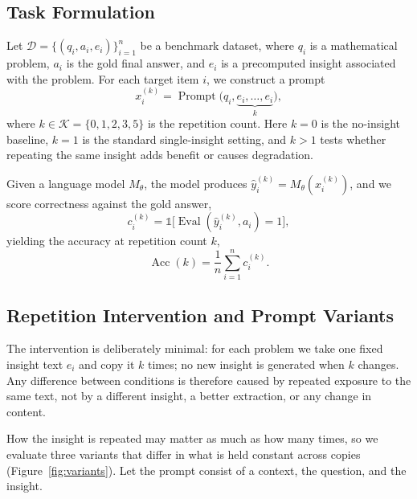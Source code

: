 
\subsection{Task Formulation}
\label{sec:task-formulation}

Let $\mathcal{D} = \{(q_i, a_i, e_i)\}_{i=1}^{n}$ be a benchmark dataset, where $q_i$ is a mathematical problem, $a_i$ is the gold final answer, and $e_i$ is a precomputed insight associated with the problem. For each target item $i$, we construct a prompt
\[
    x_i^{(k)} = \operatorname{Prompt}\bigl(q_i, \underbrace{e_i, \ldots, e_i}_{k}\bigr),
\]
where $k \in \mathcal{K} = \{0, 1, 2, 3, 5\}$ is the repetition count. Here $k=0$ is the no-insight baseline, $k=1$ is the standard single-insight setting, and $k>1$ tests whether repeating the same insight adds benefit or causes degradation.

Given a language model $M_\theta$, the model produces $\hat{y}_i^{(k)} = M_\theta(x_i^{(k)})$, and we score correctness against the gold answer,
\[
    c_i^{(k)} = \mathbb{1}\bigl[\operatorname{Eval}(\hat{y}_i^{(k)}, a_i) = 1\bigr],
\]
yielding the accuracy at repetition count $k$,
\[
    \operatorname{Acc}(k) = \frac{1}{n}\sum_{i=1}^{n} c_i^{(k)}.
\]


\subsection{Repetition Intervention and Prompt Variants}
\label{sec:repetition-intervention}


The intervention is deliberately minimal: for each problem we take one fixed insight
text $e_i$ and copy it $k$ times; no new insight is generated when $k$ changes. Any
difference between conditions is therefore caused by repeated exposure to the same
text, not by a different insight, a better extraction, or any change in content.

How the insight is repeated may matter as much as how many times, so we evaluate
three variants that differ in what is held constant across copies
(Figure~\ref{fig:variants}). Let the prompt consist of a context, the question, and
the insight.

